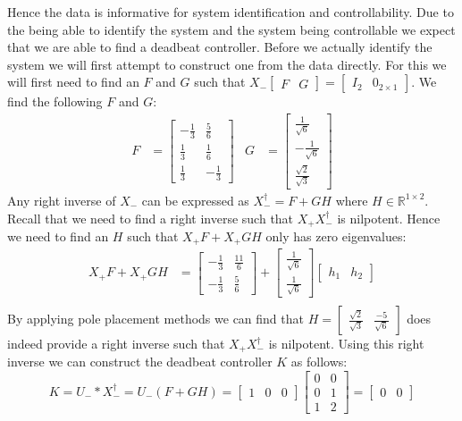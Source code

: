 Hence the data is informative for system identification and controllability. Due to the being able to identify the system and the system being controllable we expect that we are able to find a deadbeat controller. Before we actually identify the system we will first attempt to construct one from the data directly. For this we will first need to find an $F$ and $G$ such that $X_- \begin{bmatrix}F&G\end{bmatrix} = \begin{bmatrix}I_2&0_{2\times 1}\end{bmatrix}$. We find the following $F$ and $G$:
\begin{align*}
F &= \begin{bmatrix}
	-\frac{1}{3} & \frac{5}{6} \\ \frac{1}{3} & \frac{1}{6} \\ \frac{1}{3} & -\frac{1}{3}
\end{bmatrix} &
G &= \begin{bmatrix}
	\frac{1}{\sqrt{6}} \\ -\frac{1}{\sqrt{6}} \\ \frac{\sqrt{2}}{\sqrt{3}}
\end{bmatrix}
\end{align*}
Any right inverse of $X_-$ can be expressed as $X_-^\dagger = F + G H$ where $H \in \mathbb{R}^{1 \times 2}$. Recall that we need to find a right inverse such that $X_+ X_-^\dagger$ is nilpotent. Hence we need to find an $H$ such that $X_+ F + X_+ G H$ only has zero eigenvalues:
\begin{align*}
X_+ F + X_+ G H &= \begin{bmatrix} -\frac{1}{3} & \frac{11}{6} \\ -\frac{1}{3} & \frac{5}{6} \end{bmatrix} + \begin{bmatrix}\frac{1}{\sqrt{6}} \\ \frac{1}{\sqrt{6}}\end{bmatrix} \begin{bmatrix} h_1 & h_2 \end{bmatrix} \\
\end{align*} 
By applying pole placement methods we can find that $H = \begin{bmatrix} \frac{\sqrt{2}}{\sqrt{3}} & \frac{-5}{\sqrt{6}} \end{bmatrix}$ does indeed provide a right inverse such that $X_+ X_-^\dagger$ is nilpotent. Using this right inverse we can construct the deadbeat controller $K$ as follows:
\[ K = U_- * X_-^\dagger = U_- (F + G H) = \begin{bmatrix} 1&0&0 \end{bmatrix} \begin{bmatrix} 0&0\\0&1\\1&2 \end{bmatrix} = \begin{bmatrix} 0&0 \end{bmatrix} \] 

